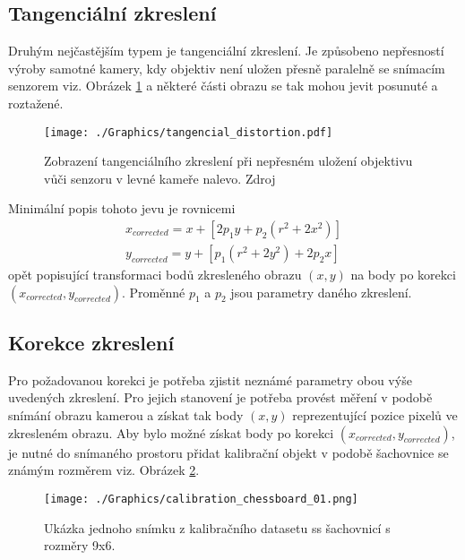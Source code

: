 \documentclass[czech, bc, kky, he, iso690numb]{fasthesis}
\begin{document}
        	\subsection{Tangenciální zkreslení}
	        	Druhým nejčastějším typem je tangenciální zkreslení. Je způsobeno nepřesností výroby samotné kamery, kdy objektiv není uložen přesně paralelně se snímacím senzorem viz. Obrázek \ref{pic:tangencial_distortion} a některé části obrazu se tak mohou jevit posunuté a roztažené.
	        		\begin{figure}[h]
	        			\centering
	        			\texttt{[image: ./Graphics/tangencial\_distortion.pdf]}
	        			\caption{Zobrazení tangenciálního zkreslení při nepřesném uložení objektivu vůči senzoru v levné kameře nalevo. Zdroj \cite[p.~377]{learning_opencv} }
	        			\label{pic:tangencial_distortion}
	        		\end{figure}
	        	Minimální popis tohoto jevu je rovnicemi
	        		\begin{eqnarray}
	        			x_{corrected} = x + [2p_{1}y + p_{2}(r^{2} + 2x^{2})]\\
	        			y_{corrected} = y + [p_{1}(r^{2} + 2y^{2}) + 2p_{2}x]
	        		\end{eqnarray}
	        	opět popisující transformaci bodů zkresleného obrazu \((x, y)\) na body po korekci \((x_{corrected}, y_{corrected})\). Proměnné \(p_{1}\) a \(p_{2}\) jsou parametry daného zkreslení.
	        \subsection{Korekce zkreslení}
	        	Pro požadovanou korekci je potřeba zjistit neznámé parametry obou výše uvedených zkreslení. Pro jejich stanovení je potřeba provést měření v podobě snímání obrazu kamerou a získat tak body \((x,y)\) reprezentující pozice pixelů ve zkresleném obrazu. Aby bylo možné získat body po korekci \((x_{corrected}, y_{corrected})\), je nutné do snímaného prostoru přidat kalibrační objekt v podobě šachovnice se známým rozměrem viz. Obrázek \ref{pic:calibration_chessboard_01}. 
	        		\begin{figure}[h]
	        			\centering
	        			\texttt{[image: ./Graphics/calibration\_chessboard\_01.png]}
	        			\caption{Ukázka jednoho snímku z kalibračního datasetu ss šachovnicí s rozměry 9x6.}
	        			\label{pic:calibration_chessboard_01}
	        		\end{figure}
	        	
\end{document}
